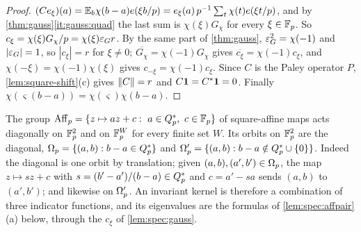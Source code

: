 \begin{proof}
$(Ce_\xi)(a)=\mathbb E_b\chi(b-a)e\!\left(\xi b/p\right)=e_\xi(a)\,p^{-1}\sum_t\chi(t)e\!\left(\xi t/p\right)$,
and by \cref{thm:gauss}\ref{it:gauss:quad} the last sum is $\chi(\xi)G_\chi$
for every $\xi\in\mathbb F_p$. So $c_\xi=\chi(\xi)G_\chi/p=\chi(\xi)\varepsilon_Gr$. By the same
part of \cref{thm:gauss}, $\varepsilon_G^2=\chi(-1)$ and $|\varepsilon_G|=1$, so $|c_\xi|=r$ for
$\xi\ne0$; $\overline{G_\chi}=\chi(-1)G_\chi$ gives $\overline{c_\xi}=\chi(-1)c_\xi$,
and $\chi(-\xi)=\chi(-1)\chi(\xi)$ gives $c_{-\xi}=\chi(-1)c_\xi$. Since $C$ is the
Paley operator $P$, \cref{lem:square-shift}(c) gives $\left\|C\right\|=r$ and
$C\mathbf 1=C^*\mathbf 1=0$. Finally $\chi(\varsigma(b-a))=\chi(\varsigma)\chi(b-a)$.
\end{proof}

The group $\mathrm{Aff}_p=\{z\mapsto az+c:\ a\in\Qsq,\ c\in\Fp\}$ of square-affine
maps acts diagonally on $\mathbb F_p^2$ and on $\mathbb F_p^W$ for every finite set $W$. Its
orbits on $\mathbb F_p^2$ are the diagonal, $\Omega_{p}=\{(a,b):b-a\in Q_{p}^{*}\}$ and
$\Omega_{p}'=\{(a,b):b-a\notin Q_{p}^{*}\cup\{0\}\}$. Indeed the diagonal is one orbit by
translation; given $(a,b),(a',b')\in\Omega_{p}$, the map $z\mapsto sz+c$ with
$s=(b'-a')/(b-a)\in Q_{p}^{*}$ and $c=a'-sa$ sends $(a,b)$ to $(a',b')$; and likewise
on $\Omega_{p}'$. An invariant kernel is therefore a combination of three indicator
functions, and its eigenvalues are the formulas of \cref{lem:spec:affpair}(a) below, through the $c_\xi$ of \cref{lem:spec:gauss}.


